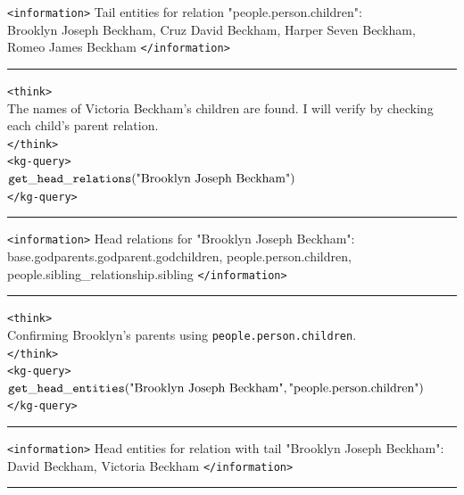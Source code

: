 \begin{table}[H]
\begin{reasonbox}[title=\framework{} Response Example — \dataset{WebQSP}]
\texttt{<information>} Tail entities for relation "people.person.children":\\
Brooklyn Joseph Beckham, Cruz David Beckham, Harper Seven Beckham, Romeo James Beckham
\texttt{</information>}

\vspace{0.5em}\hrule\vspace{0.5em}

\begin{blueblock}
\texttt{<think>}\\
The names of Victoria Beckham's children are found. I will verify by checking each child's parent relation.\\
\texttt{</think>}\\
\texttt{<kg-query>}\\
$\mathtt{get\_head\_relations}(\text{"Brooklyn Joseph Beckham"})$\\
\texttt{</kg-query>}
\end{blueblock}

\vspace{0.5em}\hrule\vspace{0.5em}

\texttt{<information>} Head relations for "Brooklyn Joseph Beckham":\\
base.godparents.godparent.godchildren, people.person.children, people.sibling\_relationship.sibling
\texttt{</information>}

\vspace{0.5em}\hrule\vspace{0.5em}

\begin{blueblock}
\texttt{<think>}\\
Confirming Brooklyn's parents using \texttt{people.person.children}.\\
\texttt{</think>}\\
\texttt{<kg-query>}\\
$\mathtt{get\_head\_entities}(\text{"Brooklyn Joseph Beckham"}, \text{"people.person.children"})$\\
\texttt{</kg-query>}
\end{blueblock}

\vspace{0.5em}\hrule\vspace{0.5em}

\texttt{<information>} Head entities for relation with tail "Brooklyn Joseph Beckham":\\
David Beckham, Victoria Beckham
\texttt{</information>}

\vspace{0.5em}\hrule\vspace{0.5em}


\end{reasonbox}
\end{table}
